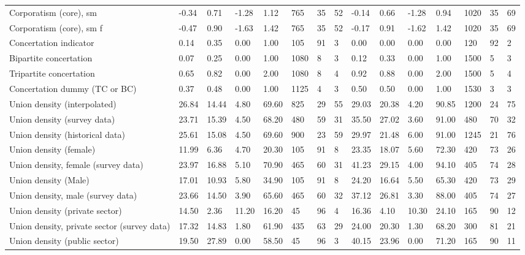 \begin{longtable}{lllllllllllllll}
\addlinespace
Corporatism (core), sm & -0.34 & 0.71 & -1.28 & 1.12 & 765 & 35 & 52 & -0.14 & 0.66 & -1.28 & 0.94 & 1020 & 35 & 69\\
Corporatism (core), sm f & -0.47 & 0.90 & -1.63 & 1.42 & 765 & 35 & 52 & -0.17 & 0.91 & -1.62 & 1.42 & 1020 & 35 & 69\\
Concertation indicator & 0.14 & 0.35 & 0.00 & 1.00 & 105 & 91 & 3 & 0.00 & 0.00 & 0.00 & 0.00 & 120 & 92 & 2\\
Bipartite concertation & 0.07 & 0.25 & 0.00 & 1.00 & 1080 & 8 & 3 & 0.12 & 0.33 & 0.00 & 1.00 & 1500 & 5 & 3\\
Tripartite concertation & 0.65 & 0.82 & 0.00 & 2.00 & 1080 & 8 & 4 & 0.92 & 0.88 & 0.00 & 2.00 & 1500 & 5 & 4\\
\addlinespace
Concertation dummy (TC or BC) & 0.37 & 0.48 & 0.00 & 1.00 & 1125 & 4 & 3 & 0.50 & 0.50 & 0.00 & 1.00 & 1530 & 3 & 3\\
Union density (interpolated) & 26.84 & 14.44 & 4.80 & 69.60 & 825 & 29 & 55 & 29.03 & 20.38 & 4.20 & 90.85 & 1200 & 24 & 75\\
Union density (survey data) & 23.71 & 15.39 & 4.50 & 68.20 & 480 & 59 & 31 & 35.50 & 27.02 & 3.60 & 91.00 & 480 & 70 & 32\\
Union density (historical data) & 25.61 & 15.08 & 4.50 & 69.60 & 900 & 23 & 59 & 29.97 & 21.48 & 6.00 & 91.00 & 1245 & 21 & 76\\
Union density (female) & 11.99 & 6.36 & 4.70 & 20.30 & 105 & 91 & 8 & 23.35 & 18.07 & 5.60 & 72.30 & 420 & 73 & 26\\
\addlinespace
Union density, female (survey data) & 23.97 & 16.88 & 5.10 & 70.90 & 465 & 60 & 31 & 41.23 & 29.15 & 4.00 & 94.10 & 405 & 74 & 28\\
Union density (Male) & 17.01 & 10.93 & 5.80 & 34.90 & 105 & 91 & 8 & 24.20 & 16.64 & 5.50 & 65.30 & 420 & 73 & 29\\
Union density, male (survey data) & 23.66 & 14.50 & 3.90 & 65.60 & 465 & 60 & 32 & 37.12 & 26.81 & 3.30 & 88.00 & 405 & 74 & 27\\
Union density (private sector) & 14.50 & 2.36 & 11.20 & 16.20 & 45 & 96 & 4 & 16.36 & 4.10 & 10.30 & 24.10 & 165 & 90 & 12\\
Union density, private sector (survey data) & 17.32 & 14.83 & 1.80 & 61.90 & 435 & 63 & 29 & 24.00 & 20.30 & 1.30 & 68.20 & 300 & 81 & 21\\
\addlinespace
Union density (public sector) & 19.50 & 27.89 & 0.00 & 58.50 & 45 & 96 & 3 & 40.15 & 23.96 & 0.00 & 71.20 & 165 & 90 & 11\\

\end{longtable}
